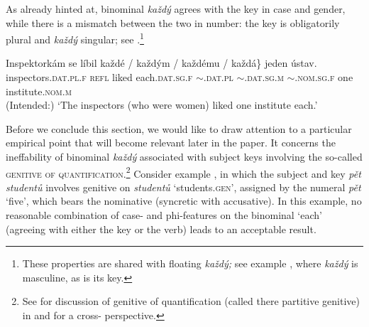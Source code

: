 \documentclass[output=paper,colorlinks,citecolor=brown,newtxmath]{langscibook}
\begin{document}
\ea\label{ex:share-subject}
\z\z

\noindent As already hinted at, binominal \textit{každý} agrees with the key in case and gender, while there is a mismatch between the two in number: the key is obligatorily plural and \textit{každý} singular; see .\footnote{These properties are shared with floating \textit{každý;} see example , where \textit{každý} is masculine, as is its key.}

\ea\label{ex:phi}\gll Inspektorkám se líbil \minsp{\{} každé / \minsp{*} každým / \minsp{*} každému /\hspace{0.3cm} \minsp{*} každá\} jeden ústav.\\
inspectors.\textsc{dat.pl.f} \textsc{refl} liked {} each.\textsc{dat.sg.f} {} {} $\sim$.\textsc{dat.pl} {} {} $\sim$.\textsc{dat.sg.m} {} {} $\sim$.\textsc{nom.sg.f} one institute.\textsc{nom.m}\\
\glt (Intended:) `The inspectors (who were women) liked one institute each.'
\z

\noindent Before we conclude this section, we would like to draw attention to a particular empirical point that will become relevant later in the paper. It concerns the ineffability of binominal \textit{každý} associated with subject keys involving the so-called \textsc{genitive of quantification}.\footnote{See \citet[Chapter 8]{Veselovska1995} for discussion of genitive of quantification (called there partitive genitive) in  and \citet{Franks1994} for a cross- perspective.} Consider example , in which the subject and key \textit{pět studentů} involves genitive on \textit{studentů} `students.\textsc{gen}', assigned by the numeral \textit{pět} `five', which bears the nominative (syncretic with accusative). In this example, no reasonable combination of case- and phi-features on the binominal `each' (agreeing with either the key or the verb) leads to an acceptable result.

\z
\end{document}
